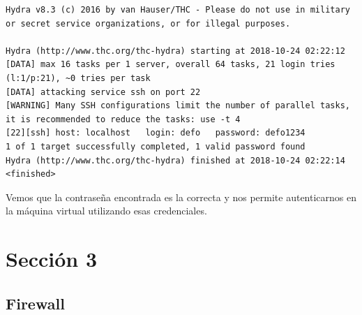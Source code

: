 \begingroup
    \fontsize{8pt}{10pt}\selectfont
\begin{lstlisting}[breaklines=true]
Hydra v8.3 (c) 2016 by van Hauser/THC - Please do not use in military or secret service organizations, or for illegal purposes.

Hydra (http://www.thc.org/thc-hydra) starting at 2018-10-24 02:22:12
[DATA] max 16 tasks per 1 server, overall 64 tasks, 21 login tries (l:1/p:21), ~0 tries per task
[DATA] attacking service ssh on port 22
[WARNING] Many SSH configurations limit the number of parallel tasks, it is recommended to reduce the tasks: use -t 4
[22][ssh] host: localhost   login: defo   password: defo1234
1 of 1 target successfully completed, 1 valid password found
Hydra (http://www.thc.org/thc-hydra) finished at 2018-10-24 02:22:14
<finished>
\end{lstlisting}
\endgroup

Vemos que la contraseña encontrada es la correcta y nos permite autenticarnos en la máquina virtual utilizando esas credenciales.

\section*{Sección 3}

\subsection*{Firewall}

